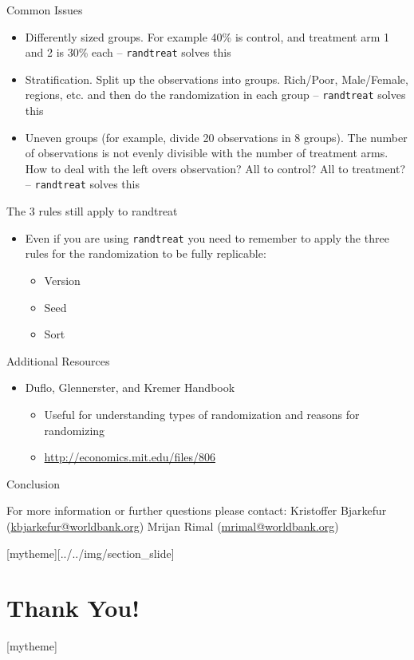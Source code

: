 \documentclass[aspectratio=169]{beamer}
\newcommand{\sectionpic}[2]{
	\setbeamertemplate{section page}[mytheme][#2]
	\section{#1}
	\setbeamertemplate{section page}[mytheme]
}
\begin{document}
\begin{frame}{Common Issues}
	\begin{itemize}
		\item Differently sized groups. For example 40\% is control, and treatment arm 1 and 2 is 30\% each – \texttt{randtreat} solves this
		\item Stratification. Split up the observations into groups. Rich/Poor, Male/Female, regions, etc. and then do the randomization in each group – \texttt{randtreat} solves this
		\item Uneven groups (for example, divide 20 observations in 8 groups). The number of observations is not evenly divisible with the number of treatment arms. How to deal with the left overs observation? All to control? All to treatment? – \texttt{randtreat} solves this
	\end{itemize}
\end{frame}



\begin{frame}{The 3 rules still apply to randtreat}
	\begin{itemize}
		\item Even if you are using \texttt{randtreat} you need to remember to apply the three rules for the randomization to be fully replicable:
		\begin{itemize}
			\item Version
			\item Seed
			\item Sort
		\end{itemize}
	\end{itemize}
\end{frame}


\begin{frame}{Additional Resources}
	\begin{itemize}
		\item Duflo, Glennerster, and Kremer Handbook
		\begin{itemize}
			\item Useful for understanding types of randomization and reasons for randomizing
			\item \url{http://economics.mit.edu/files/806}
		\end{itemize}
	\end{itemize}
\end{frame}


\begin{frame}{Conclusion}


\vspace{20mm}
For more information or further questions please contact:
\newline Kristoffer Bjarkefur (\url{kbjarkefur@worldbank.org}) \newline Mrijan Rimal (\url{mrimal@worldbank.org})

\end{frame}

\sectionpic{Thank You!}{../../img/section_slide}
\end{document}
